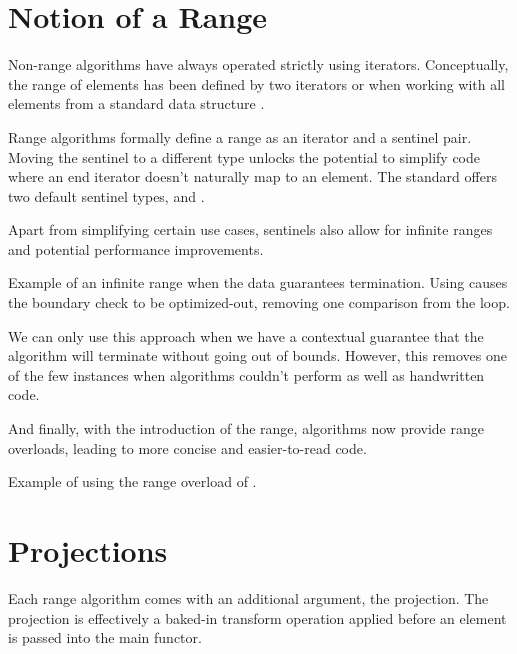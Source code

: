 \section{Notion of a Range}

Non-range algorithms have always operated strictly using iterators. Conceptually, the range of elements has been defined by two iterators \cpp{[first, last)} or when working with all elements from a standard data structure \cpp{[begin, end)}.

Range algorithms formally define a range as an iterator and a sentinel pair. Moving the sentinel to a different type unlocks the potential to simplify code where an end iterator doesn't naturally map to an element. The standard offers two default sentinel types,  and .

Apart from simplifying certain use cases, sentinels also allow for infinite ranges and potential performance improvements.

\begin{box-note}
\footnotesize Example of an infinite range when the data guarantees termination. Using  causes the boundary check to be optimized-out, removing one comparison from the loop.
\tcblower
{}
\end{box-note}

We can only use this approach when we have a contextual guarantee that the algorithm will terminate without going out of bounds. However, this removes one of the few instances when algorithms couldn't perform as well as handwritten code.

And finally, with the introduction of the range, algorithms now provide range overloads, leading to more concise and easier-to-read code.

\begin{box-note}
\footnotesize Example of using the range overload of .
\tcblower
{}
\end{box-note}

\section{Projections}

Each range algorithm comes with an additional argument, the projection.
The projection is effectively a baked-in transform operation applied before an element is passed into the main functor.

